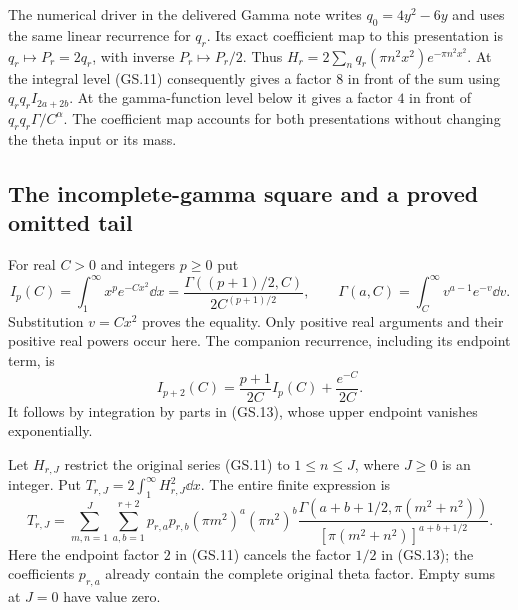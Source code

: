 The numerical driver in the delivered Gamma note writes $q_0=4y^2-6y$
and uses the same linear recurrence for $q_r$. Its exact coefficient
map to this presentation is $q_r\mapsto P_r=2q_r$, with inverse
$P_r\mapsto P_r/2$. Thus $H_r=2\sum_nq_r(\pi n^2x^2)e^{-\pi n^2x^2}$.
At the integral level (GS.11) consequently gives a factor $8$
in front of the sum using $q_rq_r I_{2a+2b}$. At the gamma-function
level below it gives a factor $4$ in front of $q_rq_r\Gamma/C^\alpha$.
The coefficient map accounts for both presentations without changing
the theta input or its mass.

\subsection{The incomplete-gamma square and a proved omitted tail}

For real $C>0$ and integers $p\ge0$ put
\begin{equation}
 I_p(C)=\int_1^\infty x^p e^{-Cx^2}\dd x
       =\frac{\Gamma((p+1)/2,C)}{2C^{(p+1)/2}},\qquad
 \Gamma(a,C)=\int_C^\infty v^{a-1}e^{-v}\dd v.\tag{GS.13}
\end{equation}
Substitution $v=Cx^2$ proves the equality. Only positive real arguments
and their positive real powers occur here. The companion recurrence,
including its endpoint term, is
\begin{equation}
 I_{p+2}(C)=\frac{p+1}{2C}I_p(C)+\frac{e^{-C}}{2C}.
 \tag{GS.14}
\end{equation}
It follows by integration by parts in (GS.13), whose upper endpoint
vanishes exponentially.

Let $H_{r,J}$ restrict the original series (GS.11) to $1\le n\le J$,
where $J\ge0$ is an integer. Put $T_{r,J}=2\int_1^\infty H_{r,J}^2\dd x$.
The entire finite expression is
\begin{equation}
 T_{r,J}=\sum_{m,n=1}^J\sum_{a,b=1}^{r+2}
 p_{r,a}p_{r,b}(\pi m^2)^a(\pi n^2)^b
 \frac{\Gamma(a+b+1/2,\pi(m^2+n^2))}
 {[\pi(m^2+n^2)]^{a+b+1/2}}.\tag{GS.15}
\end{equation}
Here the endpoint factor $2$ in (GS.11) cancels the factor $1/2$
in (GS.13); the coefficients $p_{r,a}$ already contain the complete
original theta factor. Empty sums at $J=0$ have value zero.

